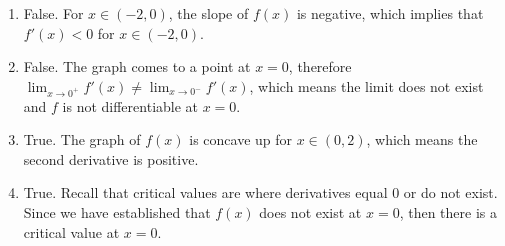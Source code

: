 \begin{Answer}[ref = shape1]
\begin{enumerate}
\item False. For $x \in (-2, 0)$, the slope of $f(x)$ is negative, which 
implies that $f'(x) < 0$ for $x \in (-2, 0)$.
\item False. The graph comes to a point at $x = 0$, therefore $\lim_{x \to 
0^+} f'(x) \neq \lim_{x \to 0^-} f'(x)$, which means the limit does not 
exist and $f$ is not differentiable at $x = 0$.
\item True. The graph of $f(x)$ is concave up for $x \in (0, 2)$, which means 
the second derivative is positive. 
\item True. Recall that critical values are where derivatives equal 0 or do 
not exist. Since we have established that $f(x)$ does not exist at $x = 0$, 
then there is a critical value at $x = 0$. 
\end{enumerate}
\end{Answer}
